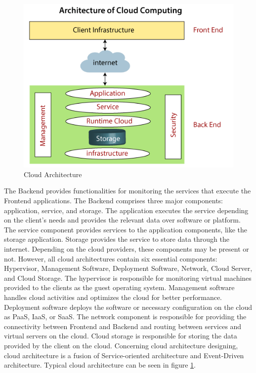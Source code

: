 \documentclass[12pt,a4paper]{article}
\begin{document}
\begin{figure}[H]
\centering
\includegraphics[scale=0.5]{cloud_architecture.PNG}
\caption{Cloud Architecture \cite{r21}}
\label{cloud_architecture}
\end{figure}

The Backend provides functionalities for monitoring the services that execute the Frontend applications. The Backend comprises three major components: application, service, and storage. The application executes the service depending on the client's needs and provides the relevant data over software or platform. The service component provides services to the application components, like the storage application. Storage provides the service to store data through the internet. Depending on the cloud providers, these components may be present or not. However, all cloud architectures contain six essential components: Hypervisor, Management Software, Deployment Software, Network, Cloud Server, and Cloud Storage. The hypervisor is responsible for monitoring virtual machines provided to the clients as the guest operating system. Management software handles cloud activities and optimizes the cloud for better performance. Deployment software deploys the software or necessary configuration on the cloud as PaaS, IaaS, or SaaS. The network component is responsible for providing the connectivity between Frontend and Backend and routing between services and virtual servers on the cloud. Cloud storage is responsible for storing the data provided by the client on the cloud. \cite{r20} Concerning cloud architecture designing, cloud architecture is a fusion of Service-oriented architecture and Event-Driven architecture. Typical cloud architecture can be seen in figure \ref{cloud_architecture}. \cite{r21} \\
\end{document}

